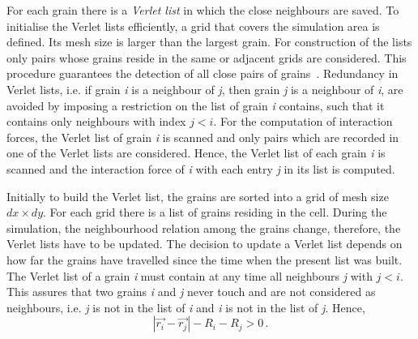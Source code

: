 For each grain there is a \textit{Verlet list} in which the close 
neighbours are saved. To initialise the Verlet lists efficiently, a grid that 
covers the simulation area is defined. Its mesh size is larger than the largest 
grain. For construction of the lists only pairs whose grains reside in the same 
or adjacent grids are considered. This procedure guarantees the detection of 
all close pairs of grains~\citep{Poschel2005}. Redundancy in Verlet lists, i.e. 
if grain \textit{i} is a neighbour of \textit{j}, then grain \textit{j} is 
a neighbour of \textit{i}, are avoided by imposing a restriction on the list of 
grain \textit{i} contains, such that it contains only neighbours with index 
$\mathit{j}<\mathit{i}$. For the computation of interaction forces, the Verlet 
list of grain \textit{i} is scanned and only pairs which are recorded in one of 
the Verlet lists are considered. Hence, the Verlet list of each grain 
\textit{i} is scanned and the interaction force of \textit{i} with each entry 
\textit{j} in its list is computed. 

Initially to build the Verlet list, the grains are sorted into a grid of mesh 
size $\mathit{dx}\times\mathit{dy}$. For each grid there is a list of grains 
residing in the cell. During the simulation, the neighbourhood relation among 
the grains change, therefore, the Verlet lists have to be updated. The decision 
to update a Verlet list depends on how far the grains have travelled since the 
time when the present list was built. The Verlet list of a grain \textit{i} 
must contain at any time all neighbours \textit{j} with 
$\mathit{j}<\mathit{i}$. This assures that two grains \textit{i} and 
\textit{j} never touch and are not considered as neighbours, i.e. \textit{j} is 
not in the list of \textit{i} and \textit{i} is not in the list of \textit{j}. 
Hence,
%
\begin{equation}
\left|\overrightarrow{r_{\mathit{i}}}-\overrightarrow{r_{\mathit{j}}}\right|
-\mathit{R}_{\mathit{i}}-\mathit{R}_{\mathit{j}}>0 \,.
\end{equation}

